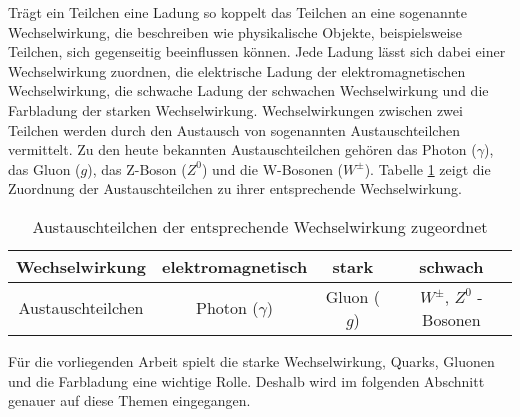 Tr\"agt ein Teilchen eine Ladung so koppelt das Teilchen an eine sogenannte Wechselwirkung, die beschreiben wie physikalische Objekte, beispielsweise Teilchen, sich gegenseitig beeinflussen k\"onnen.
Jede Ladung l\"asst sich dabei einer Wechselwirkung zuordnen,
die elektrische Ladung der elektromagnetischen Wechselwirkung, die schwache Ladung der schwachen Wechselwirkung und die Farbladung der starken Wechselwirkung.
\newline
Wechselwirkungen zwischen zwei Teilchen werden durch den Austausch von sogenannten Austauschteilchen vermittelt.
Zu den heute bekannten Austauschteilchen geh\"oren das Photon ($\gamma$), das Gluon ($g$), das Z-Boson ($Z^{0}$) und die W-Bosonen ($W^{\pm}$).
Tabelle \ref{tab:Austeilchen} zeigt die Zuordnung der Austauschteilchen zu ihrer entsprechende Wechselwirkung.
\begin{table}[h]
\centering
\begin{tabular}{|c||c|c|c|}
\hline
Wechselwirkung    & elektromagnetisch & stark       & schwach                      \\ \hline
Austauschteilchen & Photon ($\gamma$) & Gluon ($g$) & $W^{\pm}$, $Z^{0}$ - Bosonen \\ \hline
\end{tabular}
\caption{Austauschteilchen der entsprechende Wechselwirkung zugeordnet}
\label{tab:Austeilchen}
\end{table}
\newline
F{\"u}r die vorliegenden Arbeit spielt die starke Wechselwirkung, Quarks, Gluonen und die Farbladung eine wichtige Rolle.
Deshalb wird im folgenden Abschnitt genauer auf diese Themen eingegangen.